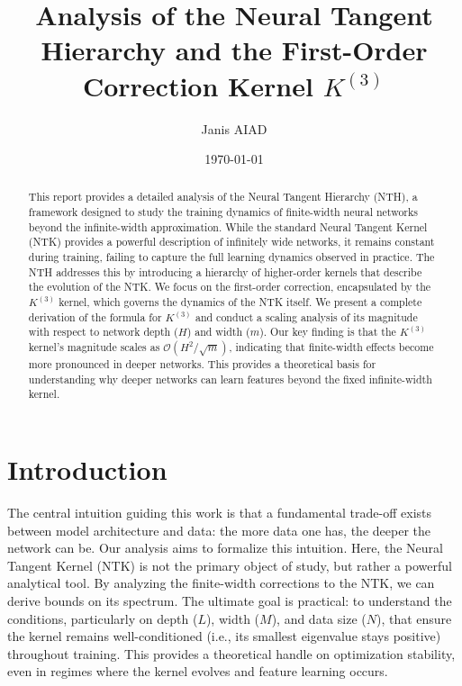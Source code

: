 \documentclass{article}
\title{Analysis of the Neural Tangent Hierarchy and the First-Order Correction Kernel $K^{(3)}$}
\author{Janis AIAD}
\date{\today}
\begin{document}
\maketitle

\begin{abstract}
This report provides a detailed analysis of the Neural Tangent Hierarchy (NTH), a framework designed to study the training dynamics of finite-width neural networks beyond the infinite-width approximation. While the standard Neural Tangent Kernel (NTK) provides a powerful description of infinitely wide networks, it remains constant during training, failing to capture the full learning dynamics observed in practice. The NTH addresses this by introducing a hierarchy of higher-order kernels that describe the evolution of the NTK. We focus on the first-order correction, encapsulated by the $K^{(3)}$ kernel, which governs the dynamics of the NTK itself. We present a complete derivation of the formula for $K^{(3)}$ and conduct a scaling analysis of its magnitude with respect to network depth ($H$) and width ($m$). Our key finding is that the $K^{(3)}$ kernel's magnitude scales as $\mathcal{O}(H^2/\sqrt{m})$, indicating that finite-width effects become more pronounced in deeper networks. This provides a theoretical basis for understanding why deeper networks can learn features beyond the fixed infinite-width kernel.
\end{abstract}

\tableofcontents
\newpage

\section{Introduction}

The central intuition guiding this work is that a fundamental trade-off exists between model architecture and data: the more data one has, the deeper the network can be. Our analysis aims to formalize this intuition. Here, the Neural Tangent Kernel (NTK) is not the primary object of study, but rather a powerful analytical tool. By analyzing the finite-width corrections to the NTK, we can derive bounds on its spectrum. The ultimate goal is practical: to understand the conditions, particularly on depth ($L$), width ($M$), and data size ($N$), that ensure the kernel remains well-conditioned (i.e., its smallest eigenvalue stays positive) throughout training. This provides a theoretical handle on optimization stability, even in regimes where the kernel evolves and feature learning occurs.
\end{document}
